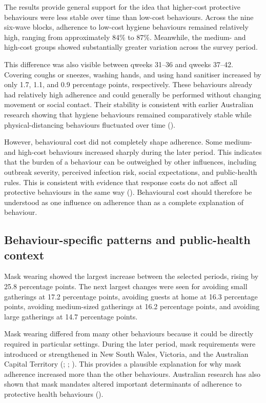 \documentclass[
  12pt,
  a4paper,
]{article}
\begin{document}
The results provide general support for the idea that higher-cost
protective behaviours were less stable over time than low-cost
behaviours. Across the nine six-wave blocks, adherence to low-cost
hygiene behaviours remained relatively high, ranging from
approximately 84\% to 87\%. Meanwhile, the medium- and high-cost groups
showed substantially greater variation across the survey period.

This difference was also visible between qweeks 31--36 and qweeks
37--42. Covering coughs or sneezes, washing hands, and using hand
sanitiser increased by only 1.7, 1.1, and 0.9 percentage points,
respectively. These behaviours already had relatively high adherence and
could generally be performed without changing movement or
social contact. Their stability is consistent with earlier Australian
research showing that hygiene behaviours remained comparatively stable
while physical-distancing behaviours fluctuated over time ().

However, behavioural cost did not completely shape adherence. Some
medium- and high-cost behaviours increased sharply during the later
period. This indicates that the burden of a behaviour can be outweighed
by other influences, including outbreak severity, perceived infection
risk, social expectations, and public-health rules. This is consistent
with evidence that response costs do not affect all protective
behaviours in the same way (). Behavioural cost
should therefore be understood as one influence on adherence than
as a complete explanation of behaviour.

\subsection{Behaviour-specific patterns and public-health context}\label{behaviour-specific-patterns-and-public-health-context}

Mask wearing showed the largest increase between the selected periods,
rising by 25.8 percentage points. The next largest changes were seen for
avoiding small gatherings at 17.2 percentage points, avoiding guests at
home at 16.3 percentage points, avoiding medium-sized gatherings at 16.2
percentage points, and avoiding large gatherings at 14.7 percentage
points.

Mask wearing differed from many other behaviours because it could be
directly required in particular settings. During the later period, mask
requirements were introduced or strengthened in New South Wales,
Victoria, and the Australian Capital Territory (; ; ). This
provides a plausible explanation for why mask adherence increased more
than the other behaviours. Australian research has also shown that mask
mandates altered important determinants of adherence to protective
health behaviours ().
\end{document}

